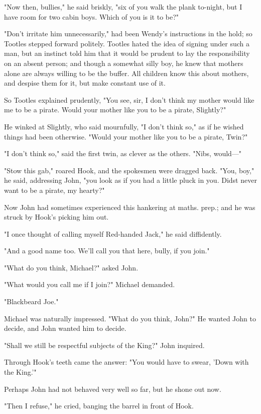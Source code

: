 "Now then, bullies," he said briskly, "six of you walk the plank to-night,
but I have room for two cabin boys. Which of you is it to be?"


"Don't irritate him unnecessarily," had been Wendy's instructions in the
hold; so Tootles stepped forward politely. Tootles hated the idea of
signing under such a man, but an instinct told him that it would be
prudent to lay the responsibility on an absent person; and though a
somewhat silly boy, he knew that mothers alone are always willing to be
the buffer. All children know this about mothers, and despise them for it,
but make constant use of it.


So Tootles explained prudently, "You see, sir, I don't think my mother
would like me to be a pirate. Would your mother like you to be a pirate,
Slightly?"


He winked at Slightly, who said mournfully, "I don't think so," as if he
wished things had been otherwise. "Would your mother like you to be a
pirate, Twin?"


"I don't think so," said the first twin, as clever as the others. "Nibs,
would—"


"Stow this gab," roared Hook, and the spokesmen were dragged back. "You,
boy," he said, addressing John, "you look as if you had a little pluck in
you. Didst never want to be a pirate, my hearty?"


Now John had sometimes experienced this hankering at maths. prep.; and he
was struck by Hook's picking him out.


"I once thought of calling myself Red-handed Jack," he said diffidently.


"And a good name too. We'll call you that here, bully, if you join."


"What do you think, Michael?" asked John.


"What would you call me if I join?" Michael demanded.


"Blackbeard Joe."


Michael was naturally impressed. "What do you think, John?" He wanted John
to decide, and John wanted him to decide.


"Shall we still be respectful subjects of the King?" John inquired.


Through Hook's teeth came the answer: "You would have to swear, 'Down with
the King.'"


Perhaps John had not behaved very well so far, but he shone out now.


"Then I refuse," he cried, banging the barrel in front of Hook.


